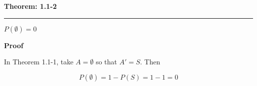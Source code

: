 \nopagenumbers
{\bf Theorem: 1.1-2}
\vskip 1mm
\hrule

\vskip 6pt
$P(\emptyset)=0$

\vskip 10pt
{\bf Proof}

\vskip 6pt
In Theorem 1.1-1, take $A=\emptyset$ so that $A'=S$. Then

$$P(\emptyset)=1-P(S)=1-1=0$$

\vfill\eject
\bye
